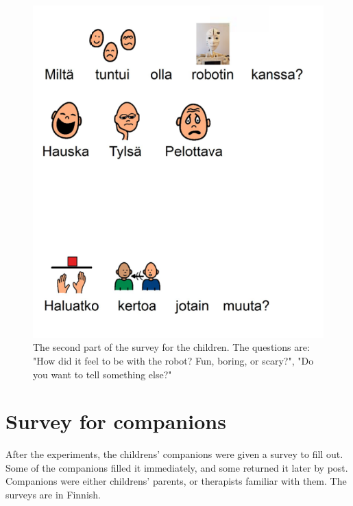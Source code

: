 \begin{figure}
\centering
  \includegraphics[scale=0.60]{images/kysely_lapselle_2.pdf}
  \caption{The second part of the survey for the children. The questions are: "How did it feel to be with the robot? Fun, boring, or scary?", "Do you want to tell something else?"}
  \label{fig:kirjelapselle2}
\end{figure}




\chapter{Survey for companions}
\label{chapter:companions}

After the experiments, the childrens' companions were given a survey to fill out. Some of the companions filled it immediately, and some returned it later by post. Companions were either childrens' parents, or therapists familiar with them. The surveys are in Finnish.

